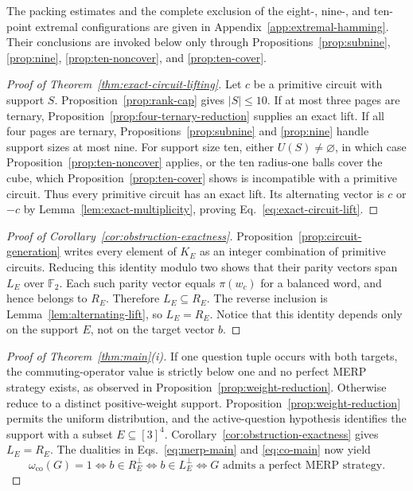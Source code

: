 \documentclass[11pt]{article}
\theoremstyle{definition}
\theoremstyle{remark}
\newcommand{\F}{\mathbb{F}}
\newcommand{\co}{\mathrm{co}}
\newcommand{\card}[1]{\lvert #1\rvert}
\numberwithin{equation}{section}
\begin{document}
The packing estimates and the complete exclusion of the eight-, nine-, and
ten-point extremal configurations are given in
Appendix~\ref{app:extremal-hamming}.  Their conclusions are invoked below
only through Propositions~\ref{prop:subnine}, \ref{prop:nine},
\ref{prop:ten-noncover}, and \ref{prop:ten-cover}.

\begin{proof}[Proof of Theorem~\ref{thm:exact-circuit-lifting}]
Let \(c\) be a primitive circuit with support \(S\).
Proposition~\ref{prop:rank-cap} gives \(\card S\leq10\).  If at most three pages are ternary,
Proposition~\ref{prop:four-ternary-reduction} supplies an exact lift.  If all
four pages are ternary, Propositions~\ref{prop:subnine} and \ref{prop:nine}
handle support sizes at most nine.  For support size ten, either
\(U(S)\neq\varnothing\), in which case
Proposition~\ref{prop:ten-noncover} applies, or the ten radius-one balls cover
the cube, which Proposition~\ref{prop:ten-cover} shows is incompatible with a
primitive circuit.  Thus every primitive circuit has an exact lift.  Its
alternating vector is \(c\) or \(-c\) by
Lemma~\ref{lem:exact-multiplicity}, proving
Eq.~\eqref{eq:exact-circuit-lift}.
\end{proof}

\begin{proof}[Proof of Corollary~\ref{cor:obstruction-exactness}]
Proposition~\ref{prop:circuit-generation} writes every element of \(K_E\) as
an integer combination of primitive circuits.  Reducing this identity modulo
two shows that their parity vectors span \(L_E\) over \(\F_2\).  Each such
parity vector equals \(\pi(w_c)\) for a balanced word, and hence belongs to
\(R_E\).  Therefore \(L_E\subseteq R_E\).  The reverse inclusion is
Lemma~\ref{lem:alternating-lift}, so \(L_E=R_E\).  Notice that this identity
depends only on the support \(E\), not on the target vector \(b\).
\end{proof}

\begin{proof}[Proof of Theorem~\ref{thm:main}(i)]
If one question tuple occurs with both targets, the commuting-operator value
is strictly below one and no perfect MERP strategy exists, as observed in
Proposition~\ref{prop:weight-reduction}.  Otherwise reduce to a distinct
positive-weight support.  Proposition~\ref{prop:weight-reduction} permits the
uniform distribution, and the active-question hypothesis identifies the
support with a subset \(E\subseteq[3]^4\).
Corollary~\ref{cor:obstruction-exactness} gives \(L_E=R_E\).  The dualities in
Eqs.~\eqref{eq:merp-main} and
\eqref{eq:co-main} now yield
\[
  \omega_{\co}(G)=1
  \Longleftrightarrow b\in R_E^\perp
  \Longleftrightarrow b\in L_E^\perp
  \Longleftrightarrow G\text{ admits a perfect MERP strategy}.
\]
\end{proof}
\end{document}
